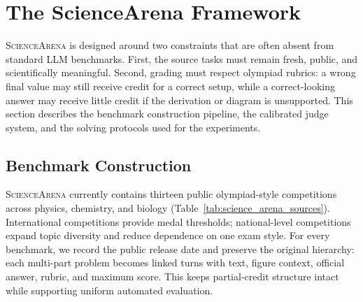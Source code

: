 \documentclass[11pt]{article}
\begin{document}
\section{The ScienceArena Framework}\label{sec:2}
\textsc{ScienceArena} is designed around two constraints that are often absent from standard LLM benchmarks.
First, the source tasks must remain fresh, public, and scientifically meaningful.
Second, grading must respect olympiad rubrics: a wrong final value may still receive credit for a correct setup, while a correct-looking answer may receive little credit if the derivation or diagram is unsupported.
This section describes the benchmark construction pipeline, the calibrated judge system, and the solving protocols used for the experiments.


\subsection{Benchmark Construction}
\textsc{ScienceArena} currently contains thirteen public olympiad-style competitions across physics, chemistry, and biology (Table~\ref{tab:science_arena_sources}).
International competitions provide medal thresholds; national-level competitions expand topic diversity and reduce dependence on one exam style.
For every benchmark, we record the public release date and preserve the original hierarchy: each multi-part problem becomes linked turns with text, figure context, official answer, rubric, and maximum score.
This keeps partial-credit structure intact while supporting uniform automated evaluation.
\end{document}
